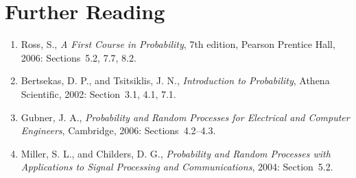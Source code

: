 \section*{Further Reading}

\begin{small}
\begin{enumerate}
\item Ross, S., \emph{A First Course in Probability}, 7th edition, Pearson Prentice Hall, 2006: Sections~5.2, 7.7, 8.2.
\item Bertsekas, D. P., and Tsitsiklis, J. N., \emph{Introduction to Probability}, Athena Scientific, 2002: Section~3.1, 4.1, 7.1.
\item Gubner, J. A., \emph{Probability and Random Processes for Electrical and Computer Engineers}, Cambridge, 2006: Sections~4.2--4.3.
\item Miller, S. L., and Childers, D. G., \emph{Probability and Random Processes with Applications to Signal Processing and Communications}, 2004: Section~5.2.
\end{enumerate}
\end{small}

